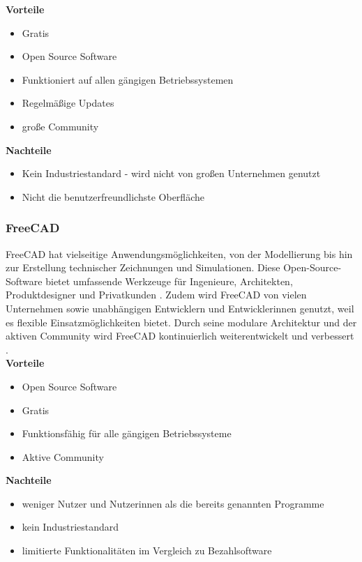 \textbf{Vorteile}
\begin{itemize}
	\item Gratis 
	\item Open Source Software
	\item Funktioniert auf allen gängigen Betriebssystemen
	\item Regelmäßige Updates
	\item große Community \textcite{BlenderProsUndCons}
\end{itemize}

\textbf{Nachteile}
\begin{itemize}
	\item Kein Industriestandard - wird nicht von großen Unternehmen genutzt
	\item Nicht die benutzerfreundlichste Oberfläche \textcite{BlenderProsUndCons}
\end{itemize}



\subsubsection{FreeCAD}
FreeCAD hat vielseitige Anwendungsmöglichkeiten, von der Modellierung bis hin zur Erstellung technischer Zeichnungen und Simulationen. Diese Open-Source-Software bietet umfassende Werkzeuge für Ingenieure, Architekten, Produktdesigner und Privatkunden \textcite{FreeCAD}. Zudem wird FreeCAD von vielen Unternehmen sowie unabhängigen Entwicklern und Entwicklerinnen genutzt, weil es flexible Einsatzmöglichkeiten bietet. Durch seine modulare Architektur und der aktiven Community wird FreeCAD kontinuierlich weiterentwickelt und verbessert   \textcite{FreeCAD2}. \\


\textbf{Vorteile}
\begin{itemize}
	\item Open Source Software
	\item Gratis
	\item Funktionsfähig für alle gängigen Betriebssysteme
	\item Aktive Community \textcite{FreeCADReviews}
\end{itemize}

\textbf{Nachteile}
\begin{itemize}
	\item weniger Nutzer und Nutzerinnen als die bereits genannten Programme
	\item kein Industriestandard
	\item limitierte Funktionalitäten im Vergleich zu Bezahlsoftware \textcite{FreeCADReviews}
\end{itemize}

